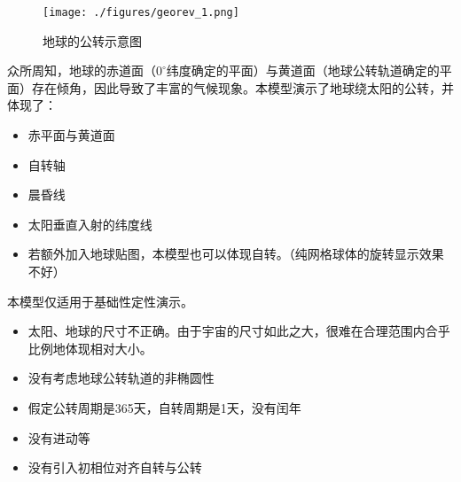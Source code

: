 

\begin{figure}[ht]
\centering
\texttt{[image: ./figures/georev\_1.png]}
\caption{地球的公转示意图} \label{georev_fig1}
\end{figure}

众所周知，地球的赤道面（$0 ^\circ$纬度确定的平面）与黄道面（地球公转轨道确定的平面）存在倾角，因此导致了丰富的气候现象。本模型演示了地球绕太阳的公转，并体现了：
\begin{itemize}
\item 赤平面与黄道面
\item 自转轴
\item 晨昏线
\item 太阳垂直入射的纬度线
\item 若额外加入地球贴图，本模型也可以体现自转。（纯网格球体的旋转显示效果不好）
\end{itemize}

本模型仅适用于基础性定性演示。
\begin{itemize}
\item 太阳、地球的尺寸不正确。由于宇宙的尺寸如此之大，很难在合理范围内合乎比例地体现相对大小。
\item 没有考虑地球公转轨道的非椭圆性
\item 假定公转周期是365天，自转周期是1天，没有闰年
\item 没有进动等
\item 没有引入初相位对齐自转与公转
\end{itemize}

